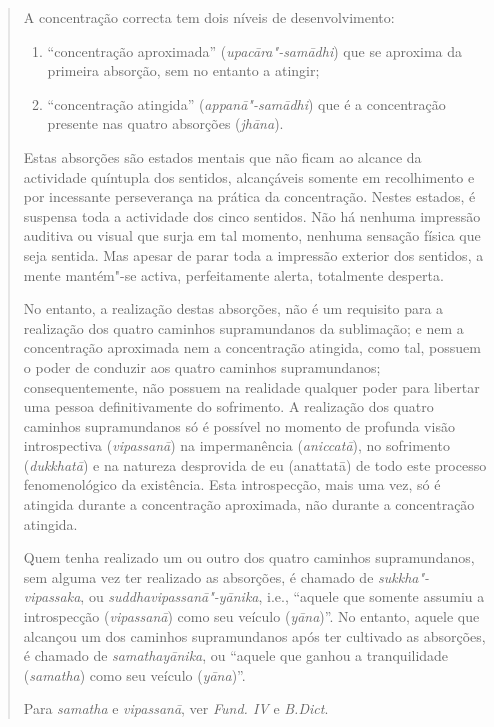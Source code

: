 \begin{quote}
  \label{jhana}
  A concentração correcta tem dois níveis de desenvolvimento:

  \begin{enumerate}
    \item “concentração aproximada” (\emph{upacāra"-samādhi}) que se aproxima
          da primeira absorção, sem no entanto a atingir;

    \item “concentração atingida” (\emph{appanā"-samādhi}) que é a
          concentração presente nas quatro absorções (\emph{jhāna}).
  \end{enumerate}

  Estas absorções são estados mentais que não ficam ao alcance da actividade
  quíntupla dos sentidos, alcançáveis somente em recolhimento e por incessante
  perseverança na prática da concentração. Nestes estados, é suspensa toda a
  actividade dos cinco sentidos. Não há nenhuma impressão auditiva ou visual que
  surja em tal momento, nenhuma sensação física que seja sentida. Mas apesar de
  parar toda a impressão exterior dos sentidos, a mente mantém"-se activa,
  perfeitamente alerta, totalmente desperta.

  No entanto, a realização destas absorções, não é um requisito para a
  realização dos quatro caminhos supramundanos da sublimação; e nem a
  concentração aproximada nem a concentração atingida, como tal, possuem o
  poder de conduzir aos quatro caminhos supramundanos; consequentemente, não
  possuem na realidade qualquer poder para libertar uma pessoa definitivamente
  do sofrimento. A realização dos quatro caminhos supramundanos só é possível no
  momento de profunda visão introspectiva (\emph{vipassanā}) na impermanência
  (\emph{aniccatā}), no sofrimento (\emph{dukkhatā}) e na natureza desprovida
  de eu (anattatā) de todo este processo fenomenológico da existência. Esta
  introspecção, mais uma vez, só é atingida durante a concentração aproximada,
  não durante a concentração atingida.

  Quem tenha realizado um ou outro dos quatro caminhos supramundanos, sem alguma
  vez ter realizado as absorções, é chamado de \emph{sukkha"-vipassaka}, ou
  \emph{suddhavipassanā"-yānika}, i.e., “aquele que somente assumiu a
  introspecção (\emph{vipassanā}) como seu veículo (\emph{yāna})”. No entanto,
  aquele que alcançou um dos caminhos supramundanos após ter cultivado as
  absorções, é chamado de \emph{samathayānika}, ou “aquele que ganhou a
  tranquilidade (\emph{samatha}) como seu veículo (\emph{yāna})”.

  Para \emph{samatha} e \emph{vipassanā}, ver \emph{Fund. IV} e \emph{B.Dict}.
\end{quote}

